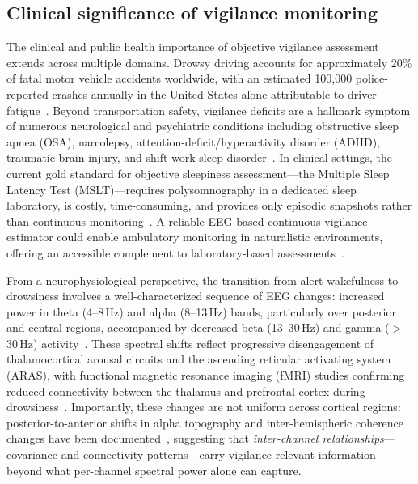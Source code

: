 \documentclass{iopjournal}
\begin{document}
\subsection{Clinical significance of vigilance monitoring}

The clinical and public health importance of objective vigilance assessment extends across multiple domains. Drowsy driving accounts for approximately 20\% of fatal motor vehicle accidents worldwide, with an estimated 100,000 police-reported crashes annually in the United States alone attributable to driver fatigue~\cite{lyznicki1998sleepiness}. Beyond transportation safety, vigilance deficits are a hallmark symptom of numerous neurological and psychiatric conditions including obstructive sleep apnea (OSA), narcolepsy, attention-deficit/hyperactivity disorder (ADHD), traumatic brain injury, and shift work sleep disorder~\cite{zhang2022eegbased,rosenberg2016neuromarker}. In clinical settings, the current gold standard for objective sleepiness assessment---the Multiple Sleep Latency Test (MSLT)---requires polysomnography in a dedicated sleep laboratory, is costly, time-consuming, and provides only episodic snapshots rather than continuous monitoring~\cite{littner2005practice}. A reliable EEG-based continuous vigilance estimator could enable ambulatory monitoring in naturalistic environments, offering an accessible complement to laboratory-based assessments~\cite{kaiser2022wearable}.

From a neurophysiological perspective, the transition from alert wakefulness to drowsiness involves a well-characterized sequence of EEG changes: increased power in theta (4--8\,Hz) and alpha (8--13\,Hz) bands, particularly over posterior and central regions, accompanied by decreased beta (13--30\,Hz) and gamma ($>$30\,Hz) activity~\cite{olbrich2012eeg}. These spectral shifts reflect progressive disengagement of thalamocortical arousal circuits and the ascending reticular activating system (ARAS), with functional magnetic resonance imaging (fMRI) studies confirming reduced connectivity between the thalamus and prefrontal cortex during drowsiness~\cite{tagliazucchi2014large}. Importantly, these changes are not uniform across cortical regions: posterior-to-anterior shifts in alpha topography and inter-hemispheric coherence changes have been documented~\cite{strijkstra2003subjective}, suggesting that \emph{inter-channel relationships}---covariance and connectivity patterns---carry vigilance-relevant information beyond what per-channel spectral power alone can capture.
\end{document}

